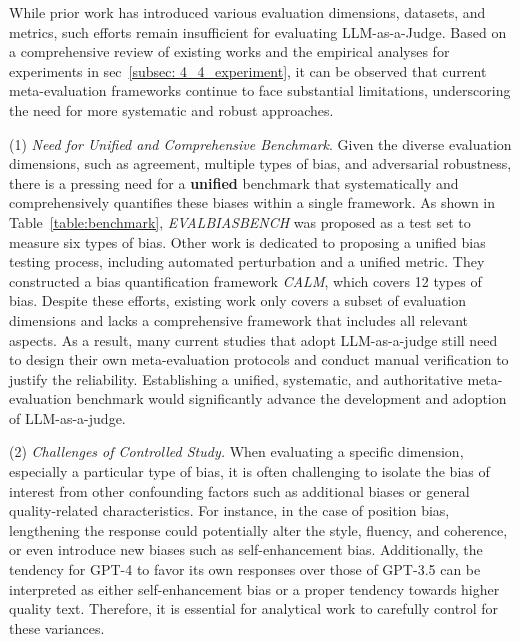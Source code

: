 While prior work has introduced various evaluation dimensions, datasets, and metrics, such efforts remain insufficient for evaluating LLM-as-a-Judge. 
Based on a comprehensive review of existing works and the empirical analyses for experiments in sec~\ref{subsec: 4_4_experiment}, it can be observed that current meta-evaluation frameworks continue to face substantial limitations, underscoring the need for more systematic and robust approaches.

(1) \textit{Need for Unified and Comprehensive Benchmark}. 
Given the diverse evaluation dimensions, such as agreement, multiple types of bias, and adversarial robustness, there is a pressing need for a \textbf{unified} benchmark that systematically and comprehensively quantifies these biases within a single framework.
As shown in Table~\ref{table:benchmark}, 
\textit{EVALBIASBENCH} \citep{offsetbias} was proposed as a test set to measure six types of bias. 
Other work \cite{ye2024justice} is dedicated to proposing a unified bias testing process, including automated perturbation and a unified metric. 
They constructed a bias quantification framework \textit{CALM}, which covers 12 types of bias.
Despite these efforts, existing work only covers a subset of evaluation dimensions and lacks a comprehensive framework that includes all relevant aspects.
As a result, many current studies that adopt LLM-as-a-judge still need to design their own meta-evaluation protocols and conduct manual verification to justify the reliability.
Establishing a unified, systematic, and authoritative meta-evaluation benchmark would significantly advance the development and adoption of LLM-as-a-judge.

(2) \textit{Challenges of Controlled Study.} 
When evaluating a specific dimension, especially a particular type of bias, it is often challenging to isolate the bias of interest from other confounding factors such as additional biases or general quality-related characteristics.
For instance, in the case of position bias, lengthening the response could potentially alter the style, fluency, and coherence, or even introduce new biases such as self-enhancement bias. 
Additionally, the tendency for GPT-4 to favor its own responses over those of GPT-3.5 can be interpreted as either self-enhancement bias or a proper tendency towards higher quality text.
Therefore, it is essential for analytical work to carefully control for these variances.



